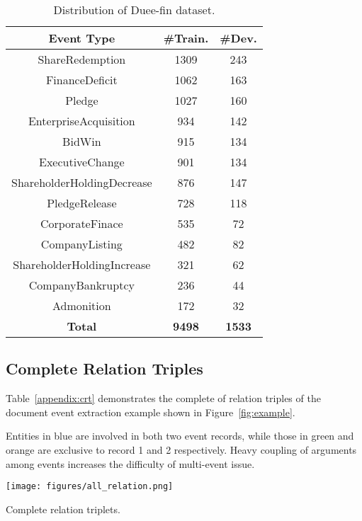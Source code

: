 \documentclass[11pt]{article}
\begin{document}
\begin{table}
\centering\small
\begin{tabular}{|c|c|c|}
\hline
\textbf{Event Type} & \textbf{\#Train.} & \textbf{\#Dev.} \\ 
\hline
ShareRedemption & 1309 & 243 \\
\hline
FinanceDeficit & 1062 & 163 \\
\hline
Pledge & 1027 & 160 \\
\hline
EnterpriseAcquisition & 934 & 142 \\
\hline
BidWin & 915 & 134 \\
\hline
ExecutiveChange & 901 & 134 \\
\hline
ShareholderHoldingDecrease & 876 & 147 \\
\hline
PledgeRelease & 728 & 118 \\
\hline
CorporateFinace & 535 & 72 \\
\hline
CompanyListing & 482 & 82 \\
\hline
ShareholderHoldingIncrease & 321 & 62 \\
\hline
CompanyBankruptcy & 236 & 44 \\
\hline
Admonition & 172 & 32 \\
\hline
\textbf{Total} & \textbf{9498} & \textbf{1533} \\
\hline
\end{tabular}
\caption{Distribution of Duee-fin dataset.}
\label{tab:duee_dist}
\end{table}



\subsection{Complete Relation Triples}
\label{section:A.2}
Table~\ref{appendix:crt} demonstrates the complete of relation triples of the document event extraction example shown in Figure~\ref{fig:example}. 

Entities in blue are involved in both two event records, while those in green and orange are exclusive to record 1 and 2 respectively. Heavy coupling of arguments among events increases the difficulty of multi-event issue.




\begin{table}\centering
    \texttt{[image: figures/all\_relation.png]}
    \caption{Complete relation triplets.}
    \label{appendix:crt}
\end{table}
\end{document}
